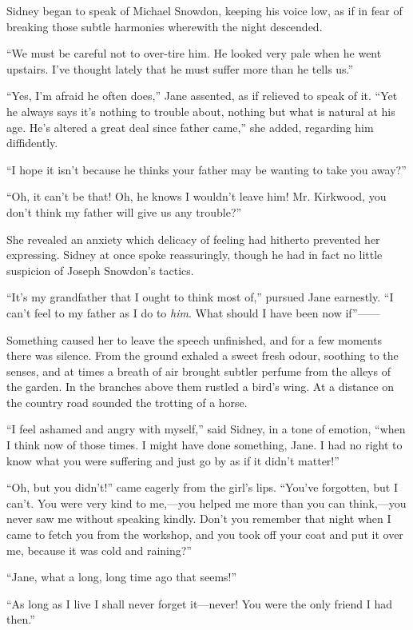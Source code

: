 Sidney began to speak of Michael Snowdon, keeping his voice low, as if
in fear of breaking those subtle harmonies wherewith the night
descended.

``We must be careful not to over-tire him. He looked very pale when he
went upstairs. I've thought lately that he must suffer more than he
tells us.''

``Yes, I'm afraid he often does,'' Jane assented, as if relieved to
speak of it. ``Yet he always says it's nothing to trouble about, nothing
but what is natural at his age. He's altered a great deal since father
came,'' she added, regarding him diffidently.

``I hope it isn't because he thinks your father may be wanting to take
you away?''

``Oh, it can't be that! Oh, he knows I {}wouldn't leave him! Mr.
Kirkwood, you don't think my father will give us any trouble?''

She revealed an anxiety which delicacy of feeling had hitherto prevented
her expressing. Sidney at once spoke reassuringly, though he had in fact
no little suspicion of Joseph Snowdon's tactics.

``It's my grandfather that I ought to think most of,'' pursued Jane
earnestly. ``I can't feel to my father as I do to \emph{him}. What
should I have been now if''{{------}}

Something caused her to leave the speech unfinished, and for a few
moments there was silence. From the ground exhaled a sweet fresh odour,
soothing to the senses, and at times a breath of air brought subtler
perfume from the alleys of the garden. In the branches above them
rustled a bird's wing. At a distance on the country road sounded the
trotting of a horse.

``I feel ashamed and angry with myself,'' said Sidney, in a tone of
emotion, ``when I think now of those times. I might have {}done
something, Jane. I had no right to know what you were suffering and just
go by as if it didn't matter!''

``Oh, but you didn't!'' came eagerly from the girl's lips. ``You've
forgotten, but I can't. You were very kind to me,---you helped me more
than you can think,---you never saw me without speaking kindly. Don't
you remember that night when I came to fetch you from the workshop, and
you took off your coat and put it over me, because it was cold and
raining?''

``Jane, what a long, long time ago that seems!''

``As long as I live I shall never forget it---never! You were the only
friend I had then.''

